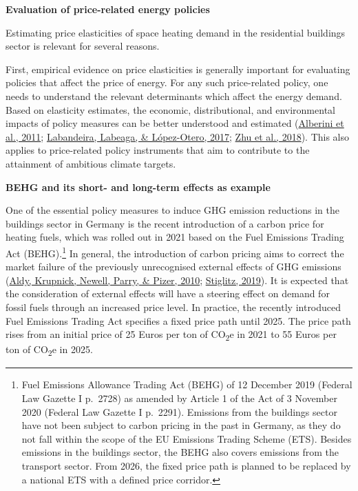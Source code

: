 \documentclass[12pt,twoside]{reedthesis}
\begin{document}
\textbf{Evaluation of price-related energy policies}

Estimating price elasticities of space heating demand in the residential buildings sector is relevant for several reasons.

First, empirical evidence on price elasticities is generally important for evaluating policies that affect the price of energy. For any such price-related policy, one needs to understand the relevant determinants which affect the energy demand. Based on elasticity estimates, the economic, distributional, and environmental impacts of policy measures can be better understood and estimated (\protect\hyperlink{ref-alberini_etal11}{Alberini et al., 2011}; \protect\hyperlink{ref-labandeira_etal17}{Labandeira, Labeaga, \& López-Otero, 2017}; \protect\hyperlink{ref-zhu_etal18}{Zhu et al., 2018}). This also applies to price-related policy instruments that aim to contribute to the attainment of ambitious climate targets.

\textbf{BEHG and its short- and long-term effects as example}

One of the essential policy measures to induce GHG emission reductions in the buildings sector in Germany is the recent introduction of a carbon price for heating fuels, which was rolled out in 2021 based on the Fuel Emissions Trading Act (BEHG).\footnote{Fuel Emissions Allowance Trading Act (BEHG) of 12 December 2019 (Federal Law Gazette I p.~2728) as amended by Article 1 of the Act of 3 November 2020 (Federal Law Gazette I p.~2291). Emissions from the buildings sector have not been subject to carbon pricing in the past in Germany, as they do not fall within the scope of the EU Emissions Trading Scheme (ETS). Besides emissions in the buildings sector, the BEHG also covers emissions from the transport sector. From 2026, the fixed price path is planned to be replaced by a national ETS with a defined price corridor.} In general, the introduction of carbon pricing aims to correct the market failure of the previously unrecognised external effects of GHG emissions (\protect\hyperlink{ref-aldy_etal10}{Aldy, Krupnick, Newell, Parry, \& Pizer, 2010}; \protect\hyperlink{ref-stiglitz19}{Stiglitz, 2019}). It is expected that the consideration of external effects will have a steering effect on demand for fossil fuels through an increased price level. In practice, the recently introduced Fuel Emissions Trading Act specifies a fixed price path until 2025. The price path rises from an initial price of 25 Euros per ton of CO\textsubscript{2}e in 2021 to 55 Euros per ton of CO\textsubscript{2}e in 2025.
\end{document}

